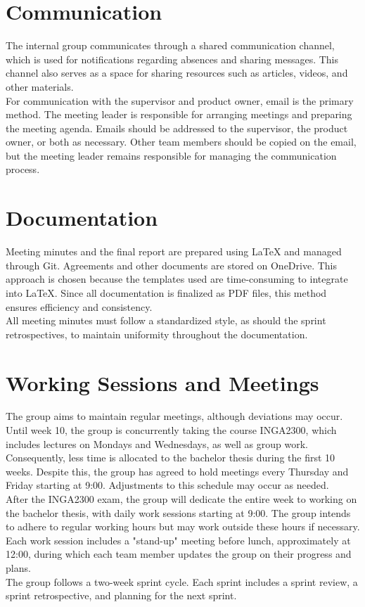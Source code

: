 \section{Communication}
The internal group communicates through a shared communication channel, which is used for notifications regarding absences and sharing messages. This channel also serves as a space for sharing resources such as articles, videos, and other materials.\\

For communication with the supervisor and product owner, email is the primary method. The meeting leader is responsible for arranging meetings and preparing the meeting agenda. Emails should be addressed to the supervisor, the product owner, or both as necessary. Other team members should be copied on the email, but the meeting leader remains responsible for managing the communication process.

\section{Documentation}
Meeting minutes and the final report are prepared using \LaTeX{} and managed through Git. Agreements and other documents are stored on OneDrive. This approach is chosen because the templates used are time-consuming to integrate into \LaTeX{}. Since all documentation is finalized as PDF files, this method ensures efficiency and consistency.\\

All meeting minutes must follow a standardized style, as should the sprint retrospectives, to maintain uniformity throughout the documentation.

\section{Working Sessions and Meetings}

The group aims to maintain regular meetings, although deviations may occur. Until week 10, the group is concurrently taking the course INGA2300, which includes lectures on Mondays and Wednesdays, as well as group work. Consequently, less time is allocated to the bachelor thesis during the first 10 weeks. Despite this, the group has agreed to hold meetings every Thursday and Friday starting at 9:00. Adjustments to this schedule may occur as needed.\\

After the INGA2300 exam, the group will dedicate the entire week to working on the bachelor thesis, with daily work sessions starting at 9:00. The group intends to adhere to regular working hours but may work outside these hours if necessary. Each work session includes a "stand-up" meeting before lunch, approximately at 12:00, during which each team member updates the group on their progress and plans.\\

The group follows a two-week sprint cycle. Each sprint includes a sprint review, a sprint retrospective, and planning for the next sprint.

